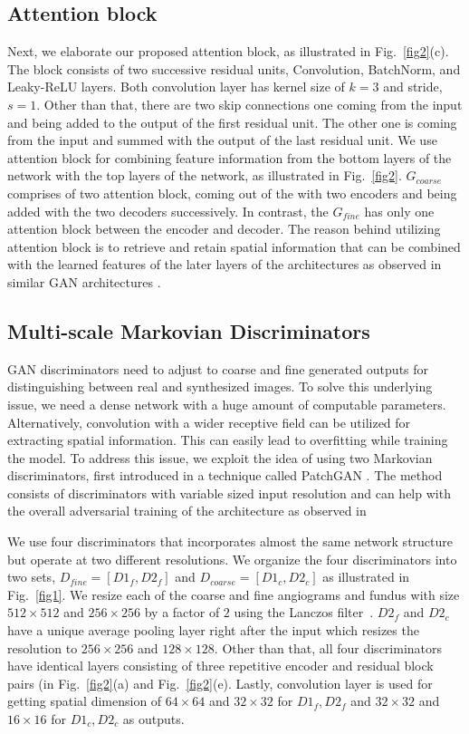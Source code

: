\documentclass[a4paper,conference]{IEEEtran}
\begin{document}
\subsection{Attention block}
\label{subsec:attention}
Next, we elaborate our proposed attention block, as illustrated in
Fig.~\ref{fig2}(c). The block consists of two successive residual units, Convolution, BatchNorm, and Leaky-ReLU layers. Both convolution layer has kernel size of $k=3$ and stride, $s=1$. Other than that, there are two skip connections one coming from the input and being added to the output of the first residual unit. The other one is coming from the input and summed with the output of the last residual unit. We use attention block for combining feature information from the bottom layers of the network with the top layers of the network, as illustrated in Fig.~\ref{fig2}. $G_{coarse}$ comprises of two attention block, coming out of the with two encoders and being added with the two decoders successively. In contrast, the $G_{fine}$ has only one attention block between the encoder and decoder.  The reason behind utilizing attention block is to retrieve and retain spatial information that can be combined with the learned features of the later layers of the architectures as observed in similar GAN architectures \cite{zhang2019self,chen2018attention}. 


\subsection{Multi-scale Markovian Discriminators}
\label{subsec:discriminators}
GAN discriminators need to adjust to coarse and fine generated outputs for distinguishing between real and synthesized images. To solve this underlying issue, we need a dense network with a huge amount of computable parameters. Alternatively, convolution with a wider receptive field can be utilized for extracting spatial information. This can easily lead to overfitting while training the model. To address this issue, we exploit the idea of using two Markovian discriminators, first introduced in a technique called PatchGAN \cite{li2016precomputed}. The method consists of discriminators with variable sized input resolution and can help with the overall adversarial training of the architecture as observed in \cite{wang2018high}

We use four discriminators that incorporates almost the same network structure but operate at two different resolutions. We organize the four discriminators into two sets, $D_{fine}=[D1_{f},D2_{f}]$ and $D_{coarse}=[D1_{c},D2_{c}]$ as illustrated in Fig.~\ref{fig1}.  We resize each of the coarse and fine angiograms and fundus with size $512\times512$ and $256\times256$ by a factor of $2$ using the Lanczos filter~\cite{duchon1979lanczos}. $D2_{f}$ and $D2_{c}$ have a unique average pooling layer right after the input which resizes the resolution to $256\times256$  and $128\times128$. Other than that, all four discriminators have identical layers consisting of three repetitive encoder and residual block pairs (in Fig.~\ref{fig2}(a) and Fig.~\ref{fig2}(e). Lastly, convolution layer is used for getting spatial dimension of $64\times64$ and $32\times32$  for $D1_{f},D2_{f}$ and $32\times32$ and $16\times16$ for $D1_{c},D2_{c}$  as outputs.
\end{document}
